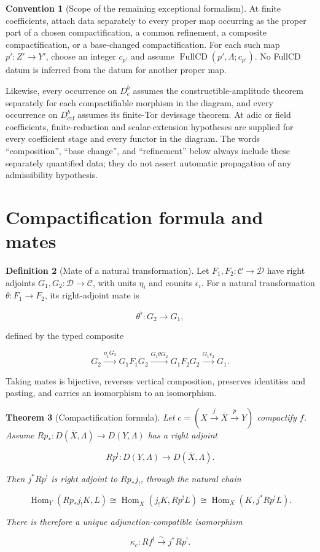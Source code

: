 \documentclass[10pt]{article}
\newtheorem{theorem}{Theorem}[section]
\theoremstyle{definition}
\newtheorem{definition}[theorem]{Definition}
\newtheorem{convention}[theorem]{Convention}
\newcommand{\Dbc}{D^b_c}
\newcommand{\Dctf}{D^b_{\mathrm{ctf}}}
\newcommand{\HomD}{\operatorname{Hom}}
\begin{document}
\begin{convention}[Scope of the remaining exceptional formalism]
At finite coefficients, attach data separately to every proper map occurring
as the proper part of a chosen compactification, a common refinement, a
composite compactification, or a base-changed compactification.  For each
such map \(p':Z'\to Y'\), choose an integer \(c_{p'}\) and assume
\(\operatorname{FullCD}(p',\Lambda;c_{p'})\).  No FullCD datum is inferred
from the datum for another proper map.

Likewise, every occurrence on \(\Dbc\) assumes the constructible-amplitude
theorem separately for each compactifiable morphism in the diagram, and
every occurrence on \(\Dctf\) assumes its finite-Tor devissage theorem.
At adic or field coefficients, finite-reduction and scalar-extension
hypotheses are supplied for every coefficient stage and every functor in the
diagram.  The words ``composition'', ``base change'', and ``refinement''
below always include these separately quantified data; they do not assert
automatic propagation of any admissibility hypothesis.
\end{convention}

\section{Compactification formula and mates}

\begin{definition}[Mate of a natural transformation]
Let \(F_1,F_2:\mathcal C\to\mathcal D\) have right adjoints
\(G_1,G_2:\mathcal D\to\mathcal C\), with units \(\eta_i\) and counits
\(\epsilon_i\).  For a natural transformation
\(\theta:F_1\to F_2\), its right-adjoint mate is

\[
 \theta^\flat:G_2\longrightarrow G_1,
\]

defined by the typed composite

\[
 G_2\xrightarrow{\eta_1G_2}G_1F_1G_2
 \xrightarrow{G_1\theta G_2}G_1F_2G_2
 \xrightarrow{G_1\epsilon_2}G_1.
\]

Taking mates is bijective, reverses vertical composition, preserves
identities and pasting, and carries an isomorphism to an isomorphism.
\end{definition}

\begin{theorem}[Compactification formula]
Let \(c=(X\xrightarrow{j}\overline X\xrightarrow{p}Y)\) compactify \(f\).
Assume \(Rp_*:D(\overline X,\Lambda)\to D(Y,\Lambda)\) has a right adjoint

\[
 Rp^!:D(Y,\Lambda)\longrightarrow D(\overline X,\Lambda).
\]

Then \(j^*Rp^!\) is right adjoint to \(Rp_*j_!\), through the natural chain

\[
 \HomD_Y(Rp_*j_!K,L)
 \cong\HomD_{\overline X}(j_!K,Rp^!L)
 \cong\HomD_X(K,j^*Rp^!L).
\]

There is therefore a unique adjunction-compatible isomorphism

\[
 \kappa_c:Rf^!\xrightarrow{\sim}j^*Rp^!.
\]
\end{theorem}
\end{document}
